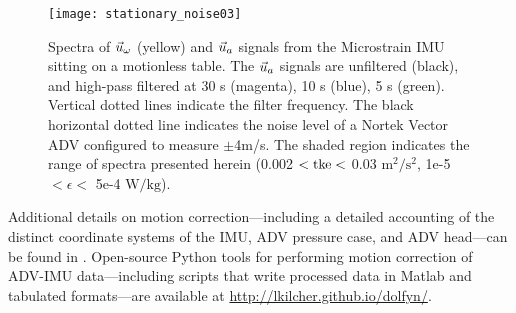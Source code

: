 \begin{figure}
  \centering
  \texttt{[image: stationary\_noise03]}
  \caption{Spectra of $\urot$ (yellow) and $\uacc$ signals from the Microstrain IMU sitting on a motionless table. The $\uacc$ signals are unfiltered (black), and high-pass filtered at 30 s (magenta), 10 s (blue), 5 s (green). Vertical dotted lines indicate the filter frequency. The black horizontal dotted line indicates the noise level of a Nortek Vector ADV configured to measure $\pm$4m/s. The shaded region indicates the range of spectra presented herein (0.002 $< \mathrm{tke} <$ 0.03 $\mathrm{m^2/s^2}$, 1e-5 $< \epsilon <$ 5e-4 $\mathrm{W/kg}$).}
  \label{fig:stnoise}
\end{figure}

Additional details on motion correction---including a detailed accounting of the distinct coordinate systems of the IMU, ADV pressure case, and ADV head---can be found in \cite{Kilcher++2016}. Open-source Python tools for performing motion correction of ADV-IMU data---including scripts that write processed data in Matlab and tabulated formats---are available at \url{http://lkilcher.github.io/dolfyn/}.

\def\ue{\ensuremath{\vec{u}\earth}}

